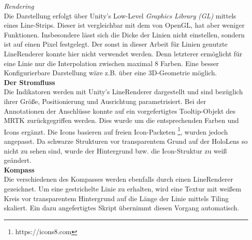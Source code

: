 \textit{Rendering}\\
Die Darstellung erfolgt über Unity's Low-Level \textit{Graphics Library (GL)} mittels eines Line-Strips. Dieser ist vergleichbar mit dem von OpenGL, hat aber weniger Funktionen. Insbesondere lässt sich die Dicke der Linien nicht einstellen, sondern ist auf einen Pixel festgelegt. Der sonst in dieser Arbeit für Linien genutzte LineRenderer konnte hier nicht verwendet werden. Denn letzterer ermöglicht für eine Linie nur die Interpolation zwischen maximal 8 Farben. Eine besser Konfigurierbare Darstellung wäre z.B. über eine 3D-Geometrie möglich.\\

\textbf{Der Stromfluss}\\
Die Indikatoren werden mit Unity's LineRenderer dargestellt und sind bezüglich ihrer Größe, Positionierung und Ausrichtung parametrisiert. Bei der Annotationen der Anschlüsse konnte auf ein vorgefertigtes Tooltip-Objekt des MRTK zurückgegriffen werden. Dies wurde um die entsprechenden Farben und Icons ergänzt. Die Icons basieren auf freien Icon-Packeten \footnote{https://icons8.com}, wurden jedoch angepasst. Da schwarze Strukturen vor transparentem Grund auf der HoloLens so nicht zu sehen sind, wurde der Hintergrund bzw. die Icon-Struktur zu weiß geändert.\\

\textbf{Kompass}\\
Die verschiedenen des Kompasses werden ebenfalls durch einen LineRenderer gezeichnet. Um eine gestrichelte Linie zu erhalten, wird eine Textur mit weißem Kreis vor transparentem Hintergrund auf die Länge der Linie mittels Tiling skaliert. Ein dazu angefertigtes Skript übernimmt diesen Vorgang automatisch.\\

